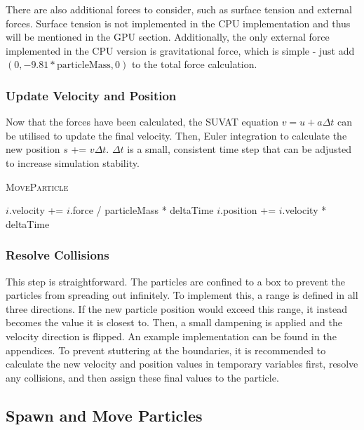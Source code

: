 \documentclass[12pt]{article}
\begin{document}
    There are also additional forces to consider, such as surface tension and external forces. Surface tension is not implemented in the CPU implementation and thus will be mentioned in the GPU section. Additionally, the only external force implemented in the CPU version is gravitational force, which is simple - just add $(0, -9.81 * \text{particleMass}, 0)$ to the total force calculation.

    \subsubsection{Update Velocity and Position}
    Now that the forces have been calculated, the SUVAT equation $v = u + a\Delta{t}$ can be utilised to update the final velocity. Then, Euler integration to calculate the new position $s$ += $v\Delta{t}$. $\Delta{t}$ is a small, consistent time step that can be adjusted to increase simulation stability.

    \begin{algorithm}[H]
        \caption{\textsc{MoveParticle}}
    
        \begin{algorithmic}[1]
                \State $i$.velocity += $i$.force / particleMass * deltaTime
                \State $i$.position += $i$.velocity * deltaTime
            \EndFor
        \end{algorithmic}

    \end{algorithm}

    \subsubsection{Resolve Collisions}

    This step is straightforward. The particles are confined to a box to prevent the particles from spreading out infinitely. To implement this, a range is defined in all three directions. If the new particle position would exceed this range, it instead becomes the value it is closest to. Then, a small dampening is applied and the velocity direction is flipped. An example implementation can be found in the appendices. To prevent stuttering at the boundaries, it is recommended to calculate the new velocity and position values in temporary variables first, resolve any collisions, and then assign these final values to the particle.

    \subsection{Spawn and Move Particles}
\end{document}
